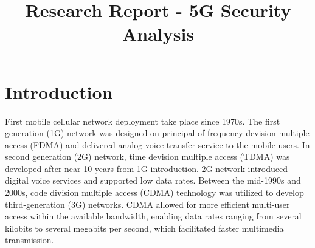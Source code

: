 \documentclass{report}
\title{Research Report - 5G Security Analysis} %
\begin{document}

\subject{Mobile and wireless networks} %




\buildmargins %
\buildcover %
\toc %


\section{Introduction}
First mobile cellular network deployment take place since 1970s\cite{illinois_bell_1979}. The first generation (1G) network was designed on principal of frequency devision multiple access (FDMA) and delivered analog voice transfer service to the mobile users. In second generation (2G) network, time devision multiple access (TDMA) was developed after near 10 years from 1G introduction.  2G network introduced digital voice services and supported low data rates. Between the mid-1990s and 2000s, code division multiple access (CDMA) technology was utilized to develop third-generation (3G) networks. CDMA allowed for more efficient multi-user access within the available bandwidth, enabling data rates ranging from several kilobits to several megabits per second, which facilitated faster multimedia transmission.\cite{wan_lei_2020}
\end{document}

